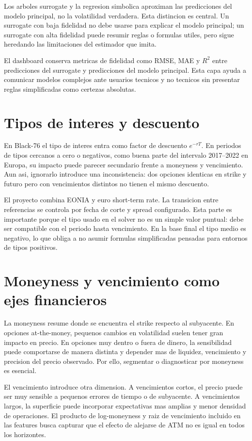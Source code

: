 Los arboles surrogate y la regresion simbolica aproximan las predicciones del modelo principal, no la volatilidad verdadera. Esta distincion es central. Un surrogate con baja fidelidad no debe usarse para explicar el modelo principal; un surrogate con alta fidelidad puede resumir reglas o formulas utiles, pero sigue heredando las limitaciones del estimador que imita.

El dashboard conserva metricas de fidelidad como RMSE, MAE y $R^2$ entre predicciones del surrogate y predicciones del modelo principal. Esta capa ayuda a comunicar modelos complejos ante usuarios tecnicos y no tecnicos sin presentar reglas simplificadas como certezas absolutas.

\section{Tipos de interes y descuento}

En Black-76 el tipo de interes entra como factor de descuento $e^{-rT}$. En periodos de tipos cercanos a cero o negativos, como buena parte del intervalo 2017--2022 en Europa, su impacto puede parecer secundario frente a moneyness y vencimiento. Aun asi, ignorarlo introduce una inconsistencia: dos opciones identicas en strike y futuro pero con vencimientos distintos no tienen el mismo descuento.

El proyecto combina EONIA y euro short-term rate. La transicion entre referencias se controla por fecha de corte y spread configurado. Esta parte es importante porque el tipo usado en el solver no es un simple valor puntual: debe ser compatible con el periodo hasta vencimiento. En la base final el tipo medio es negativo, lo que obliga a no asumir formulas simplificadas pensadas para entornos de tipos positivos.

\section{Moneyness y vencimiento como ejes financieros}

La moneyness resume donde se encuentra el strike respecto al subyacente. En opciones at-the-money, pequenos cambios en volatilidad suelen tener gran impacto en precio. En opciones muy dentro o fuera de dinero, la sensibilidad puede comportarse de manera distinta y depender mas de liquidez, vencimiento y precision del precio observado. Por ello, segmentar o diagnosticar por moneyness es esencial.

El vencimiento introduce otra dimension. A vencimientos cortos, el precio puede ser muy sensible a pequenos errores de tiempo o de subyacente. A vencimientos largos, la superficie puede incorporar expectativas mas amplias y menor densidad de operaciones. El producto de log-moneyness y raiz de vencimiento incluido en las features busca capturar que el efecto de alejarse de ATM no es igual en todos los horizontes.

